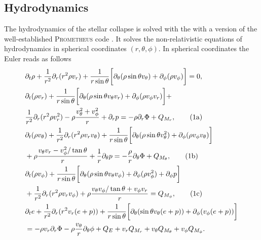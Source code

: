 \subsection{Hydrodynamics}
The hydrodynamics of the stellar collapse is solved with the with a version of the
well-established \textsc{Prometheus} code \citep{mueller_91,fryxell_91}. It solves the non-relativistic 
equations of hydrodynamics in spherical coordinates $(r,\theta,\phi)$.
In spherical coordinates the Euler reads as follows
\begin{alignat}{1}
&\partial_t \rho + \frac{1}{r^2} \partial_r (r^2 \rho v_r) + \frac{1}{r \sin{\theta}} \bigg[ \partial_{\theta} (\rho \sin{\theta} v_{\theta}) + \partial_{\phi} (\rho v_{\phi}) \bigg] = 0, \label{eqN:cont} \\
\stepcounter{equation}
&\partial_t (\rho v_r) + \frac{1}{r \sin{\theta}} \bigg[ \partial_{\theta} (\rho \sin{\theta} v_{\theta} v_r)
+\partial_{\phi} (\rho v_{\phi} v_r) \bigg]  + \nonumber \\ 
&\frac{1}{r^2} \partial_r (r^2 \rho v_r^2)  - \rho \frac{v_{\theta}^2 + v_{\phi}^2}{r} + \partial_r p 
= - \rho \partial_r \Phi + Q_{M_r}, \tag{\theequation{}a} \\
%
&\partial_t (\rho v_{\theta}) + \frac{1}{r^2} \partial_r (r^2 \rho v_r v_{\theta}) + \frac{1}{r \sin{\theta}}\bigg[ \partial_{\theta} (\rho \sin{\theta} v_{\theta}^2) +
\partial_{\phi} (\rho v_{\phi} v_{\theta}) \bigg] \nonumber \\
&+\rho \frac{v_{\theta}v_r - v_{\phi}^2/\tan{\theta}}{r} + \frac{1}{r}\partial_{\theta} p = - \frac{\rho}{r} \partial_{\theta} \Phi + Q_{M_{\theta}}, \tag{\theequation{}b} \\
%
&\partial_t (\rho v_{\phi})  
+\frac{1}{r \sin{\theta}} \bigg[ \partial_{\theta} (\rho \sin{\theta} v_{\theta} v_{\phi}) +
\partial_{\phi} (\rho v_{\phi}^2)  + \partial_{\phi} p  \bigg] \nonumber \\
&+ \frac{1}{r^2} \partial_r (r^2 \rho v_r v_{\phi}) +
\rho \frac{v_{\theta}v_{\phi}/\tan{\theta} + v_{\phi}v_r}{r}
 = Q_{M_{\phi}}, \tag{\theequation{}c} \\
%
\stepcounter{equation}
&\partial_t e + \frac{1}{r^2} \partial_r (r^2 v_r (e + p))
+\frac{1}{r \sin{\theta}} \bigg[ \partial_{\theta} ( \sin{\theta} v_{\theta} (e + p))  +
\partial_{\phi} (v_{\phi} (e + p)) \bigg] \nonumber \\
&= -\rho v_r \partial_r \Phi - \rho\frac{v_{\theta}}{r}\partial_{\theta}\phi
 + Q_E + v_r Q_{M_r} + v_{\theta} Q_{M_{\theta}} + v_{\phi} Q_{M_{\phi}}.
\end{alignat}
